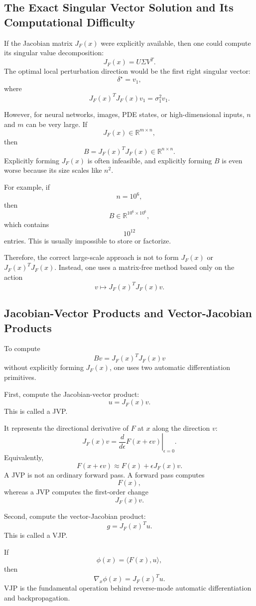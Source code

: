 \documentclass{article}
\begin{document}
\subsection{The Exact Singular Vector Solution and Its Computational Difficulty}

If the Jacobian matrix \(J_F(x)\) were explicitly available, then one could compute its singular value decomposition:
\[
J_F(x)=U\Sigma V^T.
\]
The optimal local perturbation direction would be the first right singular vector:
\[
\delta^\star=v_1,
\]
where
\[
J_F(x)^TJ_F(x)v_1
=
\sigma_1^2 v_1.
\]

However, for neural networks, images, PDE states, or high-dimensional inputs, \(n\) and \(m\) can be very large. If
\[
J_F(x)\in\mathbb{R}^{m\times n},
\]
then
\[
B=J_F(x)^TJ_F(x)\in\mathbb{R}^{n\times n}.
\]
Explicitly forming \(J_F(x)\) is often infeasible, and explicitly forming \(B\) is even worse because its size scales like \(n^2\).

For example, if
\[
n=10^6,
\]
then
\[
B\in\mathbb{R}^{10^6\times 10^6},
\]
which contains
\[
10^{12}
\]
entries. This is usually impossible to store or factorize.

Therefore, the correct large-scale approach is not to form \(J_F(x)\) or \(J_F(x)^TJ_F(x)\). Instead, one uses a matrix-free method based only on the action
\[
v\mapsto J_F(x)^TJ_F(x)v.
\]

\subsection{Jacobian-Vector Products and Vector-Jacobian Products}

To compute
\[
Bv=J_F(x)^TJ_F(x)v
\]
without explicitly forming \(J_F(x)\), one uses two automatic differentiation primitives.

First, compute the Jacobian-vector product:
\[
u=J_F(x)v.
\]
This is called a JVP.

It represents the directional derivative of \(F\) at \(x\) along the direction \(v\):
\[
J_F(x)v
=
\left.
\frac{d}{d\epsilon}
F(x+\epsilon v)
\right|_{\epsilon=0}.
\]
Equivalently,
\[
F(x+\epsilon v)
\approx
F(x)+\epsilon J_F(x)v.
\]
A JVP is not an ordinary forward pass. A forward pass computes
\[
F(x),
\]
whereas a JVP computes the first-order change
\[
J_F(x)v.
\]

Second, compute the vector-Jacobian product:
\[
g=J_F(x)^Tu.
\]
This is called a VJP.

If
\[
\phi(x)=\langle F(x),u\rangle,
\]
then
\[
\nabla_x \phi(x)=J_F(x)^Tu.
\]
VJP is the fundamental operation behind reverse-mode automatic differentiation and backpropagation.
\end{document}
